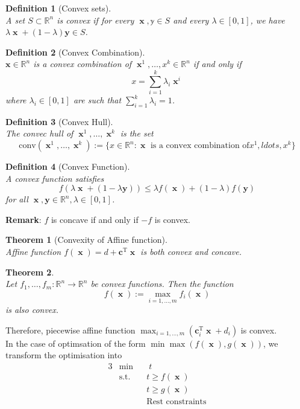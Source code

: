 \documentclass[12pt]{article}
\newcommand{\st}{\mathrm{s.t.}}
\newcommand{\T}{\mathrm{T}}
\newtheorem{definition}{Definition}[section]
\newtheorem{theorem}{Theorem}[section]
\theoremstyle{definition}
\DeclareMathOperator{\x}{\mathbf{x}}
\begin{document}
\begin{definition}[Convex sets]
\hfill\\\normalfont A set $S\subset \mathbb{R}^n$ is convex if for every $\x,\mathbb{y}\in S$ and every $\lambda\in[0,1]$, we have $\lambda\x+(1-\lambda)\mathbf{y}\in S$.
\end{definition}
\begin{definition}[Convex Combination]
\hfill\\\normalfont $\mathbf{x}\in\mathbb{R}^n$ is a convex combination of $\x^1,\ldots, x^k\in\mathbb{R}^n$ if and only if
\[
x=\sum_{i=1}^k \lambda_i\x^i
\]
where $\lambda_i\in[0,1]$ are such that $\sum_{i=1}^k \lambda_i=1$.
\end{definition}
\begin{definition}[Convex Hull]
\hfill\\\normalfont The convec hull of $\x^1,\ldots, \x^k$ is the set
\[
\text{conv}(\x^1,\ldots, \x^k):=\{x\in\mathbb{R}^n:\x \text{ is a convex combination of} x^1,ldots, x^k\}
\]
\end{definition}
\begin{definition}[Convex Function]
\hfill\\\normalfont A convex function satisfies
\[
f(\lambda\x+(1-\lambda\mathbf{y}))\leq \lambda f(\x)+(1-\lambda)f(\mathbf{y})
\]
for all $\x,\mathbf{y}\in\mathbb{R}^n, \lambda\in[0,1]$.
\end{definition}
\textbf{Remark}: $f$ is concave if and only if $-f$ is convex.\\
\begin{theorem}[Convexity of Affine function]
\hfill\\\normalfont Affine function $f(\x)=d+\mathbf{c}^\T\x$ is both convex and concave.
\end{theorem}
\begin{theorem}
\hfill\\\normalfont Let $f_1,\ldots, f_m:\mathbb{R}^n\to\mathbb{R}^n$ be convex functions. Then the function
\[
f(\x):=\max_{i=1,\ldots, m} f_i(\x)
\]
is also convex.
\end{theorem}
Therefore, piecewise affine function $\max_{i=1,\ldots, m}(\mathbf{c}_i^\T\x+d_i)$ is convex.\\
In the case of optimsation of the form $\min\max(f(\x), g(\x))$, we transform the optimisation into 
\begin{alignat*}{3}
&\min&&\;t\\
&\st &&t\geq f(\x)\\
&&&t\geq g(\x)\\
&&&\text{Rest constraints}
\end{alignat*}
\clearpage
\end{document}
